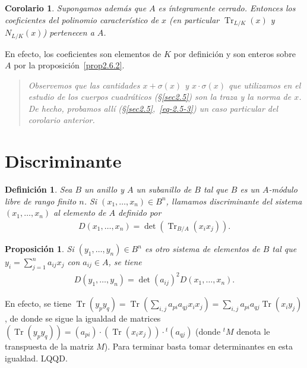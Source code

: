 \documentclass[bibtotoc,leqno,spanish]{amsbook}
\newcommand{\QED}{LQQD.}
\DeclareMathOperator{\Tr}{Tr}
\numberwithin{equation}{section}
\newenvironment{comm}%
	{\begin{quotation}\itshape\Small}
	{\end{quotation}}
\theoremstyle{note}
\newtheorem{definition}{Definici\'on}
\theoremstyle{note}
\newtheorem{proposition}{Proposici\'on}
\newtheorem*{corollary*}{Corolario}
\theoremstyle{rem}
\numberwithin{theorem}{section}
\numberwithin{proposition}{section}
\numberwithin{definition}{section}
\numberwithin{lemma}{section}
\numberwithin{corollary}{section}
\numberwithin{example}{section}
\numberwithin{footnote}{section}%
\begin{document}
\begin{corollary*}
Supongamos adem\'as que $A$ es \'integramente cerrado. Entonces los coeficientes del polinomio caracter\'istico
de $x$ (en particular $\Tr_{L/K}(x)$ y $N_{L/K}(x)$) pertenecen a $A$.
\end{corollary*}

En efecto, los coeficientes son elementos de $K$ por definici\'on y son enteros sobre $A$ por la proposici\'on~\ref{prop2.6.2}.

\begin{comm}
Observemos que las cantidades $x+\sigma(x)$ y $x\cdot\sigma(x)$ que utilizamos en el estudio de los
cuerpos cuadr\'aticos (\S\ref{sec2.5}) son la traza y la norma de $x$. De hecho, probamos all\'i (\S\ref{sec2.5},~\eqref{eq-2.5-3})
un caso particular del corolario anterior.
\end{comm}

\section{Discriminante}\label{sec2.7}

\begin{definition}\label{def2.7.1}
Sea $B$ un anillo y $A$ un subanillo de $B$ tal que $B$ es un $A$-m\'odulo libre de rango finito $n$.
Si $(x_{1},\dots,x_{n})\in B^{n}$, llamamos discriminante del sistema $(x_{1},\dots,x_{n})$ al elemento
de $A$ definido por
\begin{gather}
D(x_{1},\dots,x_{n}) = \det(\Tr_{B/A}(x_{i}x_{j})).
\end{gather}
\end{definition}

\begin{proposition}\label{prop2.7.1}
Si $(y_{1},\dots,y_{n})\in B^{n}$ es otro sistema de elementos de $B$ tal que $y_{i} = \sum_{j=1}^{n}a_{ij}x_{j}$
con $a_{ij}\in A$, se tiene
\begin{gather}
D(y_{1},\dots,y_{n}) = \det(a_{ij})^{2}D(x_{1},\dots,x_{n}).
\end{gather}
\end{proposition}

En efecto, se tiene $\Tr(y_{p}y_{q}) = \Tr\left(\sum_{i,j}a_{pi}a_{qj}x_{i}x_{j}\right) = \sum_{i,j}a_{pi}a_{qj}
\Tr(x_{i}y_{j})$, de donde se sigue la igualdad de matrices
$(\Tr(y_{p}y_{q})) = (a_{pi})\cdot(\Tr(x_{i}x_{j}))\cdot{}^{t}(a_{qj})$ (donde ${}^{t}M$ denota le transpuesta de la
matriz $M$). Para terminar basta tomar determinantes en esta igualdad. \QED
\end{document}
